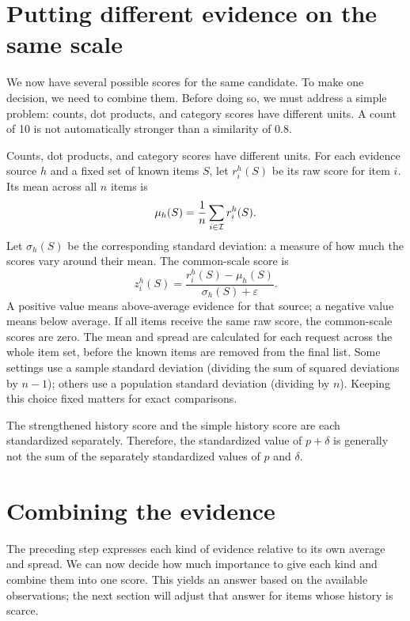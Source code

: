 \documentclass[11pt,a4paper]{article}
\numberwithin{equation}{section}
\begin{document}
\section{Putting different evidence on the same scale}\label{scale}
We now have several possible scores for the same candidate. To make one decision, we need
to combine them. Before doing so, we must address a simple problem: counts, dot products,
and category scores have different units. A count of 10 is not automatically stronger than
a similarity of 0.8.

Counts, dot products, and category scores have different units. For each evidence source
$h$ and a fixed set of known items $S$, let $r_i^h(S)$ be its raw score for item $i$.
Its mean across all $n$ items is
\begin{equation}
 \mu_h(S)=\frac1n\sum_{i\in\mathcal I}r_i^h(S).
\end{equation}
Let $\sigma_h(S)$ be the corresponding standard deviation: a measure of how much the
scores vary around their mean. The common-scale score is
\begin{equation}\label{standard}
 z_i^h(S)=\frac{r_i^h(S)-\mu_h(S)}{\sigma_h(S)+\varepsilon}.
\end{equation}
A positive value means above-average evidence for that source; a negative value means
below average. If all items receive the same raw score, the common-scale scores are zero.
The mean and spread are calculated for each request across the whole item set, before the
known items are removed from the final list. Some settings use a sample standard deviation
(dividing the sum of squared deviations by $n-1$); others use a population standard deviation
(dividing by $n$). Keeping this choice fixed matters for exact comparisons.

The strengthened history score and the simple history score are each standardized
separately. Therefore, the standardized value of $p+\delta$ is generally not the sum of
the separately standardized values of $p$ and $\delta$.

\section{Combining the evidence}\label{combine}
The preceding step expresses each kind of evidence relative to its own average and spread.
We can now decide how much importance to give each kind and combine them into one score.
This yields an answer based on the available observations; the next section will adjust
that answer for items whose history is scarce.
\end{document}
